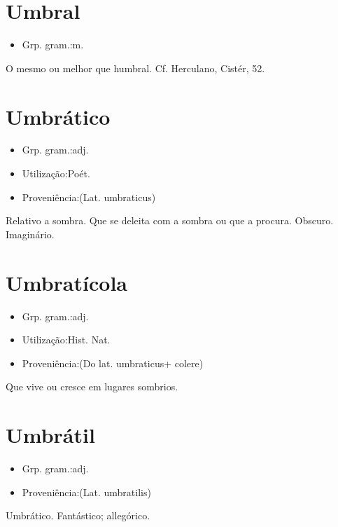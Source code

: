 \documentclass{article}
\begin{document}
\section{Umbral}
\begin{itemize}
\item {Grp. gram.:m.}
\end{itemize}
O mesmo ou melhor que \textunderscore humbral\textunderscore . Cf. Herculano, \textunderscore Cistér\textunderscore , 52.
\section{Umbrático}
\begin{itemize}
\item {Grp. gram.:adj.}
\end{itemize}
\begin{itemize}
\item {Utilização:Poét.}
\end{itemize}
\begin{itemize}
\item {Proveniência:(Lat. \textunderscore umbraticus\textunderscore )}
\end{itemize}
Relativo a sombra.
Que se deleita com a sombra ou que a procura.
Obscuro.
Imaginário.
\section{Umbratícola}
\begin{itemize}
\item {Grp. gram.:adj.}
\end{itemize}
\begin{itemize}
\item {Utilização:Hist. Nat.}
\end{itemize}
\begin{itemize}
\item {Proveniência:(Do lat. \textunderscore umbraticus\textunderscore  + \textunderscore colere\textunderscore )}
\end{itemize}
Que vive ou cresce em lugares sombrios.
\section{Umbrátil}
\begin{itemize}
\item {Grp. gram.:adj.}
\end{itemize}
\begin{itemize}
\item {Proveniência:(Lat. \textunderscore umbratilis\textunderscore )}
\end{itemize}
Umbrático.
Fantástico; allegórico.
\end{document}
